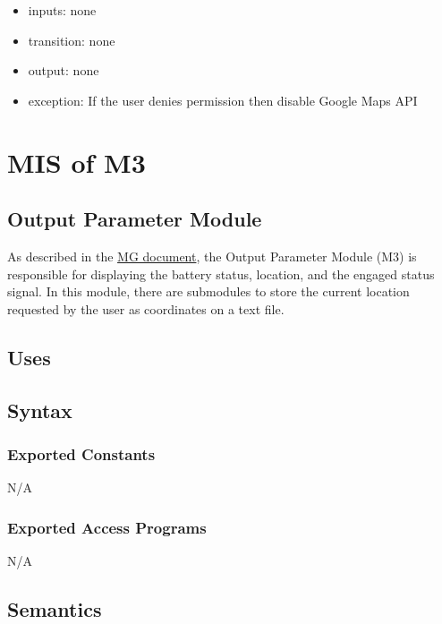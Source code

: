 \documentclass[12pt, titlepage]{article}
\begin{document}
\begin{itemize}
\item inputs: none
\item transition: none
\item output: none
\item exception: If the user denies permission then disable Google Maps API 
\end{itemize}



\section{MIS of M3} \label{OutputParameters} 

\subsection{Output Parameter Module}

As described in the \href{https://github.com/NevoAbigail/Capstone/blob/main/docs/Design/SoftArchitecture/MG.pdf}{MG document}, the Output Parameter Module (M3) is responsible for displaying the battery status, location, and the engaged status signal. In this module, there are submodules to store the current location requested by the user as coordinates on a text file. 

\subsection{Uses}


\subsection{Syntax}

\subsubsection{Exported Constants}

N/A

\subsubsection{Exported Access Programs}

N/A

\subsection{Semantics}
\end{document}
